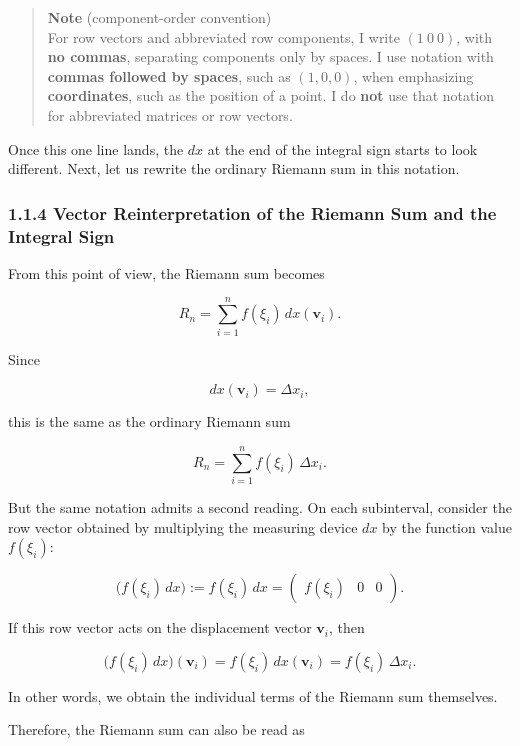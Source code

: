 \begin{quote}
\textbf{Note} (component-order convention)\\
For row vectors and abbreviated row components, I write \((1\ 0\ 0)\),
with \textbf{no commas}, separating components only by spaces. I use
notation with \textbf{commas followed by spaces}, such as \((1, 0, 0)\),
when emphasizing \textbf{coordinates}, such as the position of a point.
I do \textbf{not} use that notation for abbreviated matrices or row
vectors.
\end{quote}

Once this one line lands, the \(dx\) at the end of the integral sign
starts to look different. Next, let us rewrite the ordinary Riemann sum
in this notation.

\hypertarget{vector-reinterpretation-of-the-riemann-sum-and-the-integral-sign}{%
\subsubsection{1.1.4 Vector Reinterpretation of the Riemann Sum and the
Integral
Sign}\label{vector-reinterpretation-of-the-riemann-sum-and-the-integral-sign}}

From this point of view, the Riemann sum becomes

\[
R_n
=
\sum_{i=1}^n f(\xi_i)\,dx(\mathbf{v}_i).
\]

Since

\[
dx(\mathbf{v}_i)=\Delta x_i,
\]

this is the same as the ordinary Riemann sum

\[
R_n
=
\sum_{i=1}^n f(\xi_i)\,\Delta x_i.
\]

But the same notation admits a second reading. On each subinterval,
consider the row vector obtained by multiplying the measuring device
\(dx\) by the function value \(f(\xi_i)\):

\[
\bigl(f(\xi_i)\,dx\bigr)
:=
f(\xi_i)\,dx
=
\begin{pmatrix}
f(\xi_i) & 0 & 0
\end{pmatrix}.
\]

If this row vector acts on the displacement vector \(\mathbf{v}_i\),
then

\[
\bigl(f(\xi_i)\,dx\bigr)(\mathbf{v}_i)
=
f(\xi_i)\,dx(\mathbf{v}_i)
=
f(\xi_i)\,\Delta x_i.
\]

In other words, we obtain the individual terms of the Riemann sum
themselves.

Therefore, the Riemann sum can also be read as

